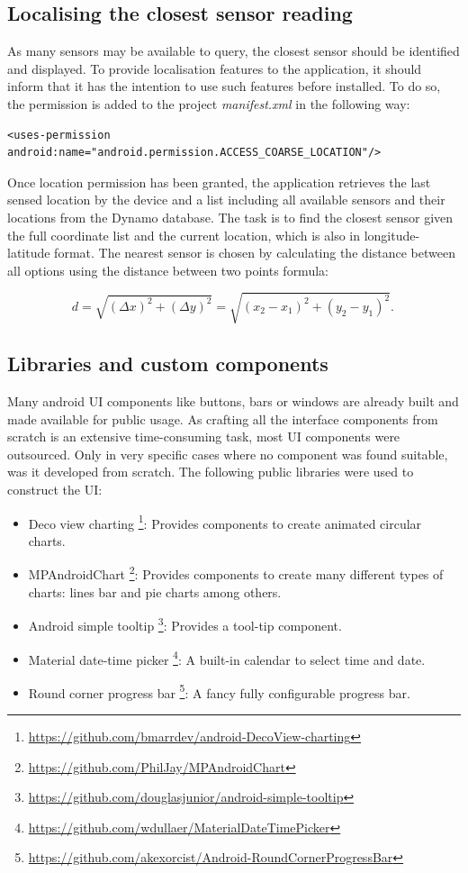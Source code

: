 \subsection{Localising the closest sensor reading}
As many sensors may be available to query, the closest sensor should be identified and displayed. To provide localisation features to the application, it should inform that it has the intention to use such features before installed. To do so, the permission is added to the project \textit{manifest.xml} in the following way: \bigskip

{\centering
\begin{BVerbatim}
<uses-permission android:name="android.permission.ACCESS_COARSE_LOCATION"/>
\end{BVerbatim}
\par
}
\bigskip

Once location permission has been granted, the application retrieves the last sensed location by the device and a list including all available sensors and their locations from the Dynamo database. The task is to find the closest sensor given the full coordinate list and the current location, which is also in longitude-latitude format. The nearest sensor is chosen by calculating the distance between all options using the distance between two points formula: 

\begin{equation}
d={\sqrt {(\Delta x)^{2}+(\Delta y)^{2}}}={\sqrt {(x_{2}-x_{1})^{2}+(y_{2}-y_{1})^{2}}}.\,
\end{equation}

\subsection{Libraries and custom components}
Many android UI components like buttons, bars or windows are already built and made available for public usage. As crafting all the interface components from scratch is an extensive time-consuming task, most UI components were outsourced. Only in very specific cases where no component was found suitable, was it developed from scratch. 
The following public libraries were used to construct the UI:
\begin{itemize}
    \item Deco view charting \footnote{\url{https://github.com/bmarrdev/android-DecoView-charting}}: Provides components to create animated circular charts.
    \item MPAndroidChart \footnote{\url{https://github.com/PhilJay/MPAndroidChart}}: Provides components to create many different types of charts: lines bar and pie charts among others.
    \item Android simple tooltip \footnote{\url{https://github.com/douglasjunior/android-simple-tooltip}}: Provides a tool-tip component.
	\item Material date-time picker \footnote{\url{https://github.com/wdullaer/MaterialDateTimePicker}}: A built-in calendar to select time and date.
  \item Round corner progress bar \footnote{\url{https://github.com/akexorcist/Android-RoundCornerProgressBar}}: A fancy fully configurable progress bar.
\end{itemize}

